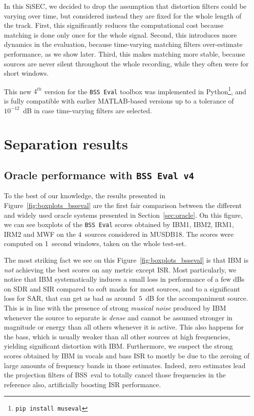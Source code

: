 \documentclass{article}
\begin{document}
In this SiSEC, we decided to drop the assumption that distortion filters could be varying over time, but considered instead they are fixed for the whole length of the track. First, this significantly reduces the computational cost because matching is done only once for the whole signal. Second, this introduces more dynamics in the evaluation, because time-varying matching filters over-estimate performance, as we show later. Third, this makes matching more stable, because sources are never silent throughout the whole recording, while they often were for short windows.

This new $4^{th}$ version for the \texttt{BSS~Eval} toolbox was implemented in Python\footnote{\texttt{pip install museval}}, and is fully compatible with earlier MATLAB-based versions up to a tolerance of $10^{-12}$~dB in case time-varying filters are selected.

\section{Separation results}
\subsection{Oracle performance with \texttt{BSS Eval v4}}
\label{ssec:bsseval-results}

To the best of our knowledge, the results presented in Figure~\ref{fig:boxplots_bsseval} are the first fair comparison between the different and widely used oracle systems presented in Section~\ref{sec:oracle}. On this figure, we can see boxplots of the \texttt{BSS~Eval} scores obtained by IBM1, IBM2, IRM1, IRM2 and MWF on the $4$~sources considered in MUSDB18. The scores were computed on 1~second windows, taken on the whole test-set.

The most striking fact we see on this Figure~\ref{fig:boxplots_bsseval} is that IBM is \textit{not} achieving the best scores on any metric except ISR. Most particularly, we notice that IBM systematically induces a small loss in performance of a few dBs on SDR and SIR compared to soft masks for most sources, and to a significant loss for SAR, that can get as bad as around~$5$~dB for the accompaniment source. This is in line with the presence of strong \textit{musical noise} produced by IBM whenever the source to separate is \textit{dense} and cannot be assumed stronger in magnitude or energy than all others whenever it is active. This also happens for the bass, which is usually weaker than all other sources at high frequencies, yielding significant distortion with IBM. Furthermore, we suspect the strong scores obtained by IBM in vocals and bass ISR to mostly be due to the zeroing of large amounts of frequency bands in those estimates. Indeed, zero estimates lead the projection filters of BSS~eval to totally cancel those frequencies in the reference also, artificially boosting ISR performance.
\end{document}
